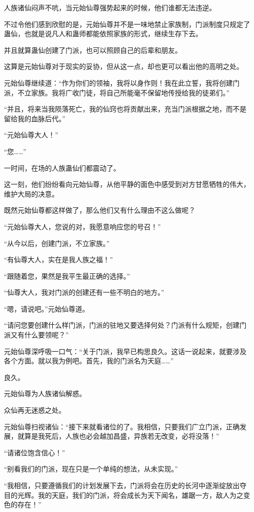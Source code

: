 \begin{this_body}
人族诸仙闷声不吭，当元始仙尊强势起来的时候，他们谁都无法违逆。

不过令他们感到欣慰的是，元始仙尊并不是一味地禁止家族制，门派制度只规定了蛊仙，也就是说凡人和蛊师都能依照家族的形式，继续生存下去。

并且就算蛊仙创建了门派，也可以照顾自己的后辈和朋友。

这算是元始仙尊对于现实的妥协，但从这一点，却也更可以看出他的高明之处。

元始仙尊继续道：“作为你们的领袖，我将以身作则！我在此立誓，我将创建门派，不立家族。我将广收门徒，将自己所能毫不保留地传授给我的徒弟们。”

“并且，将来当我陨落死亡，我的仙窍也将贡献出来，充当门派根据之地，而不是留给我的血脉后代。”

“元始仙尊大人！”

“您……”

一时间，在场的人族蛊仙们都震动了。

这一刻，他们纷纷看向元始仙尊，从他平静的面色中感受到对方甘愿牺牲的伟大，维护大局的决意。

既然元始仙尊都这样做了，那么他们又有什么理由不这么做呢？

“元始仙尊大人，您说的对，我愿意响应您的号召！”

“从今以后，创建门派，不立家族。”

“有仙尊大人，实在是我人族之福！”

“跟随着您，果然是我平生最正确的选择。”

“仙尊大人，我对门派的创建还有一些不明白的地方。”

“嗯，请说吧。”元始仙尊道。

“请问您要创建什么样门派，门派的驻地又要选择何处？门派有什么规矩，创建门派又有什么要领呢？”

元始仙尊深呼吸一口气：“关于门派，我早已构思良久。这话一说起来，就要涉及各个方面。就以我为例吧。首先，我的门派名为天庭……”

良久。

元始仙尊为人族诸仙解惑。

众仙再无迷惑之处。

元始仙尊扫视诸仙：“接下来就看诸位的了。我相信，只要我们广立门派，正确发展，就算是我死后，人族也必会越加昌盛，异族若无改变，必将没落！”

“请诸位饱含信心！”

“别看我们的门派，现在只是一个单纯的想法，从未实现。”

“我相信，只要遵循我们的计划发展下去，门派将会在历史的长河中逐渐绽放出夺目的光辉。我的天庭，我们的门派，将会成长为天下闻名，雄踞一方，敌人为之变色的存在！”


\end{this_body}
